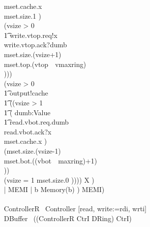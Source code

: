 \documentclass[10pt]{article}
\begin{document}
\begin{circus}
                                 mset.cache.x \then \\
                                 mset.size.1 \then \Skip)
                             \\
                             \extchoice 
                             (\lcircguard vsize > 0 \rcircguard \circguard \\
                             \t1
                                 write.vtop.req!x \then \\
                                 write.vtop.ack?dumb \then \\
                                 mset.size.(vsize+1) \then \\
                                 mset.top.(vtop~\mod~vmaxring) \then \\
                                 \Skip))) \\
                \extchoice
                (\lcircguard vsize > 0 \rcircguard \circguard \\
                    \t1
                        output!cache \then \\
                        \t1
                            ((\lcircguard vsize > 1 \rcircguard \circguard \\
                                                                \t1
                            (
                            \Intchoice dumb:Value \circspot \\
                            \t1
                            read.vbot.req.dumb \then \\
                            read.vbot.ack?x \then \\
                            mset.cache.x \then \Skip
                            )\circseq\ \\
                            (mset.size.(vsize-1) \then \\
                                    mset.bot.((vbot~\mod~maxring)+1) \then \\
                                    \Skip))
                        \\
                        \extchoice (\lcircguard vsize = 1 \rcircguard 
                                    \circguard mset.size.0 \then \Skip))))
                \circseq X
            ) \\
            \lpar {} | MEMI | { b } \rpar Memory(b)
        ) \circhide MEMI)
    \\
    \circend
    \\
    \circprocess ControllerR \circdef\ Controller [read, write:=rdi, wrti]
    \\
    \circprocess DBuffer \circdef\ ((ControllerR \lpar CtrI \rpar DRing) \circhide CtrI)
\end{circus}%
\end{document}
